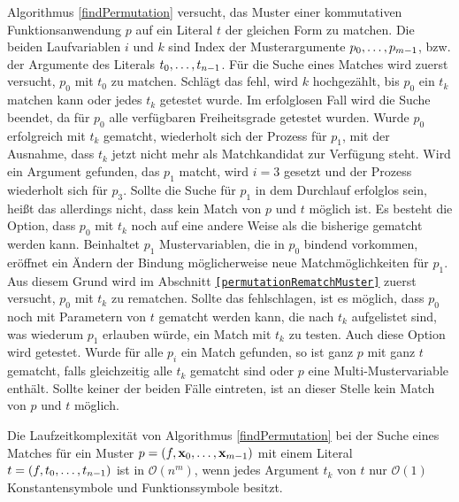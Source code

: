 Algorithmus \ref{findPermutation} versucht, das Muster einer kommutativen Funktionsanwendung $p$ auf ein Literal $t$ der gleichen Form zu matchen. Die beiden Laufvariablen $i$ und $k$ sind Index der Musterargumente ${p}_{0}, \dots, {p}_{m-1}$, bzw. der Argumente des Literals ${t}_{0}, \dots, {t}_{n-1}$. Für die Suche eines Matches wird zuerst versucht, $p_0$ mit $t_0$ zu matchen. Schlägt das fehl, wird $k$ hochgezählt, bis $p_0$ ein $t_k$ matchen kann oder jedes $t_k$ getestet wurde. Im erfolglosen Fall wird die Suche beendet, da für $p_0$ alle verfügbaren Freiheitsgrade getestet wurden. Wurde $p_0$ erfolgreich mit $t_k$ gematcht, wiederholt sich der Prozess für $p_1$, mit der Ausnahme, dass $t_k$ jetzt nicht mehr als Matchkandidat zur Verfügung steht. Wird ein Argument gefunden, das $p_1$ matcht, wird $i = 3$ gesetzt und der Prozess wiederholt sich für $p_3$. Sollte die Suche für $p_1$ in dem Durchlauf erfolglos sein, heißt das allerdings nicht, dass kein Match von $p$ und $t$ möglich ist. Es besteht die Option, dass $p_0$ mit $t_k$ noch auf eine andere Weise als die bisherige gematcht werden kann. Beinhaltet $p_1$ Mustervariablen, die in $p_0$ bindend vorkommen, eröffnet ein Ändern der Bindung möglicherweise neue Matchmöglichkeiten für $p_1$. Aus diesem Grund wird im Abschnitt \texttt{\ref{permutationRematchMuster}} zuerst versucht, $p_0$ mit $t_k$ zu rematchen. Sollte das fehlschlagen, ist es möglich, dass $p_0$ noch mit Parametern von $t$ gematcht werden kann, die nach $t_k$ aufgelistet sind, was wiederum $p_1$ erlauben würde, ein Match mit $t_k$ zu testen. Auch diese Option wird getestet.
Wurde für alle $p_i$ ein Match gefunden, so ist ganz $p$ mit ganz $t$ gematcht, falls gleichzeitig alle $t_k$ gematcht sind oder $p$ eine Multi-Mustervariable enthält. Sollte keiner der beiden Fälle eintreten, ist an dieser Stelle kein Match von $p$ und $t$ möglich. 


\begin{lemma}\label{lemKomplexitaetFindPermutation}
Die Laufzeitkomplexität von Algorithmus \ref{findPermutation} bei der Suche eines Matches für ein Muster $p = (f, {\mathbf x}_{0}, \dots, {\mathbf x}_{m-1})$ mit einem Literal $t = (f, {t}_{0}, \dots, {t}_{n-1})$ ist in $\mathcal O(n^m)$, wenn jedes Argument $t_k$ von $t$ nur $\mathcal O(1)$ Konstantensymbole und Funktionssymbole besitzt.
\end{lemma}

